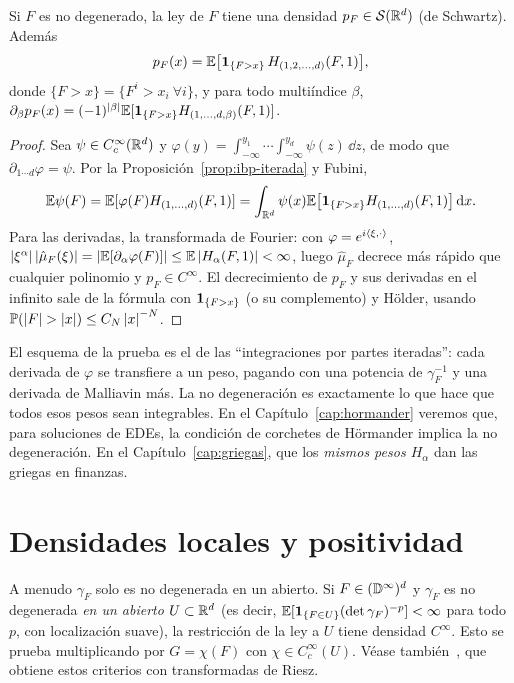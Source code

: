 \begin{teorema}[Malliavin]\label{teo:malliavin-densidad}
Si $F$ es no degenerado, la ley de $F$ tiene una densidad $p_F\in\mathcal S(\mathbb{R}^d)$
(de Schwartz). Además
\[
  p_F(x)=\mathbb{E}\big[\mathbf{1}_{\{F>x\}}\,H_{(1,2,\dots,d)}(F,1)\big],
\]
donde $\{F>x\}=\{F^i>x_i\ \forall i\}$, y para todo multiíndice $\beta$, $\partial_\beta p_F(x)=
(-1)^{\left\lvert \beta\right\rvert}\mathbb{E}[\mathbf{1}_{\{F>x\}}H_{(1,\dots,d,\beta)}(F,1)]$.
\end{teorema}

\begin{proof}
Sea $\psi\in C_c^\infty(\mathbb{R}^d)$ y $\varphi(y)=\int_{-\infty}^{y_1}\cdots\int_{-\infty}^{y_d}\psi(z)\,\dd z$, de modo que $\partial_{1\cdots d}\varphi=\psi$. Por
la Proposición~\ref{prop:ibp-iterada} y Fubini,
\[
  \mathbb{E}\psi(F)=\mathbb{E}[\varphi(F)H_{(1,\dots,d)}(F,1)]=\int_{\mathbb{R}^d}\psi(x)\mathbb{E}\big[\mathbf{1}_{\{F>x\}}H_{(1,\dots,d)}(F,1)\big]\,\mathrm{d} x.
\]
Para las derivadas, la transformada de Fourier: con $\varphi=e^{i\left\langle \xi, \cdot\right\rangle}$, $\left\lvert \xi^\alpha\right\rvert\left\lvert \hat\mu_F(\xi)\right\rvert=\left\lvert \mathbb{E}[\partial_\alpha\varphi(F)]\right\rvert\le
\mathbb{E}\left\lvert H_\alpha(F,1)\right\rvert<\infty$, luego $\hat\mu_F$ decrece más rápido que cualquier polinomio y $p_F\in C^\infty$. El decrecimiento
de $p_F$ y sus derivadas en el infinito sale de la fórmula con $\mathbf{1}_{\{F>x\}}$ (o su complemento) y
Hölder, usando $\mathbb{P}(\left\lvert F\right\rvert>\left\lvert x\right\rvert)\le C_N\left\lvert x\right\rvert^{-N}$.
\end{proof}

\begin{intuicion}
El esquema de la prueba es el de las ``integraciones por partes iteradas'': cada derivada de
$\varphi$ se transfiere a un peso, pagando con una potencia de $\gamma_F^{-1}$ y una derivada de Malliavin
más. La no degeneración es exactamente lo que hace que todos esos pesos sean integrables.
En el Capítulo~\ref{cap:hormander} veremos que, para soluciones de EDEs, la condición de corchetes de
Hörmander implica la no degeneración. En el Capítulo~\ref{cap:griegas}, que los \emph{mismos pesos $H_\alpha$} dan
las griegas en finanzas.
\end{intuicion}

\section{Densidades locales y positividad}
A menudo $\gamma_F$ solo es no degenerada en un abierto. Si $F\in(\mathbb{D}^\infty)^d$ y $\gamma_F$ es no degenerada \emph{en
un abierto} $U\subset\mathbb{R}^d$ (es decir, $\mathbb{E}[\mathbf{1}_{\{F\in U\}}(\det\gamma_F)^{-p}]<\infty$ para todo $p$, con localización suave), la
restricción de la ley a $U$ tiene densidad $C^\infty$. Esto se prueba multiplicando por $G=\chi(F)$ con
$\chi\in C_c^\infty(U)$. Véase también~\cite{BallyCaramellino11}, que obtiene estos criterios con transformadas de Riesz.

